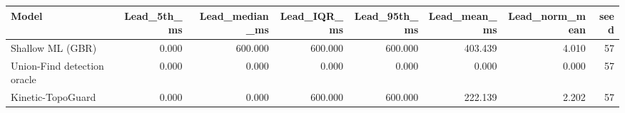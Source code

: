 \begin{tabular}{lrrrrrrr}
\toprule
Model & Lead\_5th\_ms & Lead\_median\_ms & Lead\_IQR\_ms & Lead\_95th\_ms & Lead\_mean\_ms & Lead\_norm\_mean & seed \\
\midrule
Shallow ML (GBR) & 0.000 & 600.000 & 600.000 & 600.000 & 403.439 & 4.010 & 57 \\
Union-Find detection oracle & 0.000 & 0.000 & 0.000 & 0.000 & 0.000 & 0.000 & 57 \\
Kinetic-TopoGuard & 0.000 & 0.000 & 600.000 & 600.000 & 222.139 & 2.202 & 57 \\
\bottomrule
\end{tabular}